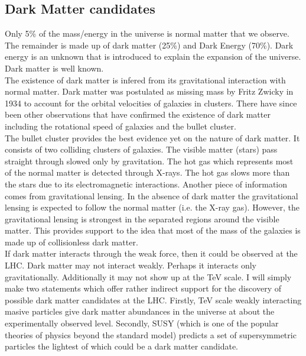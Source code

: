 \subsection{Dark Matter candidates}

Only 5\% of the mass/energy in the universe is normal matter that we observe. 
The remainder is made up of dark matter (25\%) and Dark Energy (70\%). Dark
energy is an unknown that is introduced to explain the expansion of the
universe. Dark matter is well known. \\

The existence of dark matter is infered from its gravitational interaction with
normal matter. Dark matter was postulated as missing mass by Fritz Zwicky in 
1934 to account for the orbital velocities of galaxies in clusters. There have 
since been other observations that have confirmed the existence of dark matter 
including the rotational speed of galaxies and the bullet cluster. \\

The bullet cluster provides the best evidence yet on the nature of dark matter. 
It consists of two colliding clusters of galaxies. The visible matter (stars) 
pass straight through slowed only by gravitation. The hot gas which represents 
most of the normal matter is detected through X-rays. The hot gas slows more 
than the stars due to its electromagnetic interactions. Another piece of
information comes from gravitational lensing. In the absence of dark matter the
gravitational lensing is expected to follow the normal matter (i.e. the X-ray 
gas). However, the gravitational lensing is strongest in the separated regions
around the visible matter. This provides support to the idea that most of the 
mass of the galaxies is made up of collisionless dark matter. \\

If dark matter interacts through the weak force, then it could be observed at
the LHC. Dark matter may not interact weakly. Perhaps it interacts only 
gravitationally. Additionally it may not show up at the TeV scale. I will simply
make two statements which offer rather indirect support for the discovery of 
possible dark matter candidates at the LHC. Firstly, TeV scale weakly 
interacting masive particles give dark matter abundances in the universe at 
about the experimentally observed level. Secondly, SUSY (which is one of the 
popular theories of physics beyond the standard model) predicts a set of 
supersymmetric particles the lightest of which could be a dark matter candidate.

